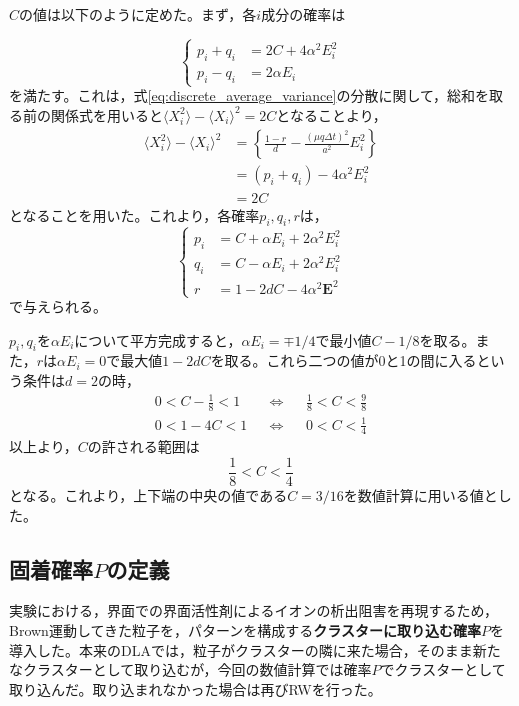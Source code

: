 \documentclass[autodetect-engine,dvi=dvipdfmx,a4paper,ja=standard,oneside,openany,11pt]{bxjsbook}
\begin{document}
$C$の値は以下のように定めた。まず，各$i$成分の確率は

\begin{equation}
  \left\{
  \begin{aligned}
    p_i+q_i & =2C+4\alpha^2E_i^2 \\
    p_i-q_i & =2\alpha E_i
  \end{aligned}
  \right.
  \label{eq:prob}
\end{equation}
を満たす。これは，式\eqref{eq:discrete_average_variance}の分散に関して，総和を取る前の関係式を用いると$\langle X_i^2\rangle-\langle X_i\rangle^2=2C$となることより，
\begin{equation}
  \begin{split}
    \langle X_i^2\rangle-\langle X_i\rangle^2 & =\left\{\frac{1-r}{d}-\frac{(\mu q \Delta t)^2}{a^2}E_i^2\right\} \\
                                              & =(p_i+q_i)-4\alpha^2E_i^2                                         \\
                                              & =2C
  \end{split}
  \label{eq:prob_middle}
\end{equation}
となることを用いた。これより，各確率$p_i,q_i,r$は，
\begin{equation}
  \left\{
  \begin{aligned}
    p_i & =C+\alpha E_i+2\alpha^2 E_i^2 \\
    q_i & =C-\alpha E_i+2\alpha^2 E_i^2 \\
    r   & =1-2dC-4\alpha^2\bm{E}^2
  \end{aligned}
  \right.
  \label{eq:prob3}
\end{equation}
で与えられる。

$p_i,q_i$を$\alpha E_i$について平方完成すると，$\alpha E_i=\mp1/4$で最小値$C-1/8$を取る。また，$r$は$\alpha E_i=0$で最大値$1-2dC$を取る。これら二つの値が0と1の間に入るという条件は$d=2$の時，
\begin{align}
  0<C-\frac{1}{8}<1 &  & \Leftrightarrow &  & \frac{1}{8}<C<\frac{9}{8} \\
  0<1-4C<1          &  & \Leftrightarrow &  & 0<C<\frac{1}{4}
  \label{eq:condition}
\end{align}
以上より，$C$の許される範囲は
\begin{equation}
  \frac{1}{8}<C<\frac{1}{4}
  \label{eq:condition2}
\end{equation}
となる。これより，上下端の中央の値である$C=3/16$を数値計算に用いる値とした。
\subsection{固着確率$P$の定義}
実験における，界面での界面活性剤によるイオンの析出阻害を再現するため，Brown運動してきた粒子を，パターンを構成する\textbf{クラスターに取り込む確率$P$}を導入した。本来のDLAでは，粒子がクラスターの隣に来た場合，そのまま新たなクラスターとして取り込むが，今回の数値計算では確率$P$でクラスターとして取り込んだ。取り込まれなかった場合は再びRWを行った。
\end{document}
